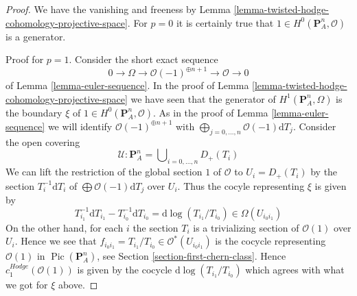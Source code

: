 \documentclass[10pt,a4paper]{amsart}
\theoremstyle{plain}
\theoremstyle{definition}
\theoremstyle{remark}
\numberwithin{equation}{subsection}
\def\Pic{\mathop{\mathrm{Pic}}\nolimits}
\begin{document}
\begin{proof}
We have the vanishing and freeness by
Lemma \ref{lemma-twisted-hodge-cohomology-projective-space}.
For $p = 0$ it is certainly true that
$1 \in H^0(\mathbf{P}^n_A, \mathcal{O})$ is a generator.

\medskip\noindent
Proof for $p = 1$. Consider the short exact sequence
$$
0 \to \Omega \to \mathcal{O}(-1)^{\oplus n + 1} \to \mathcal{O} \to 0
$$
of Lemma \ref{lemma-euler-sequence}. In the proof of
Lemma \ref{lemma-twisted-hodge-cohomology-projective-space}
we have seen that the generator of $H^1(\mathbf{P}^n_A, \Omega)$
is the boundary $\xi$ of $1 \in H^0(\mathbf{P}^n_A, \mathcal{O})$.
As in the proof of Lemma \ref{lemma-euler-sequence} we will identify
$\mathcal{O}(-1)^{\oplus n + 1}$ with
$\bigoplus_{j = 0, \ldots, n} \mathcal{O}(-1)\text{d}T_j$.
Consider the open covering
$$
\mathcal{U} : 
\mathbf{P}^n_A =
\bigcup\nolimits_{i = 0, \ldots, n} D_{+}(T_i)
$$
We can lift the restriction of the global section $1$ of $\mathcal{O}$
to $U_i = D_+(T_i)$ by the section $T_i^{-1} \text{d}T_i$ of
$\bigoplus \mathcal{O}(-1)\text{d}T_j$ over $U_i$. Thus the cocyle
representing $\xi$ is given by
$$
T_{i_1}^{-1} \text{d}T_{i_1} - T_{i_0}^{-1} \text{d}T_{i_0} =
\text{d}\log(T_{i_1}/T_{i_0}) \in \Omega(U_{i_0i_1})
$$
On the other hand, for each $i$ the section $T_i$ is a trivializing
section of $\mathcal{O}(1)$ over $U_i$. Hence we see that
$f_{i_0i_1} = T_{i_1}/T_{i_0} \in \mathcal{O}^*(U_{i_0i_1})$
is the cocycle representing $\mathcal{O}(1)$ in $\Pic(\mathbf{P}^n_A)$,
see Section \ref{section-first-chern-class}.
Hence $c_1^{Hodge}(\mathcal{O}(1))$
is given by the cocycle $\text{d}\log(T_{i_1}/T_{i_0})$
which agrees with what we got for $\xi$ above.


\end{proof}
\end{document}
